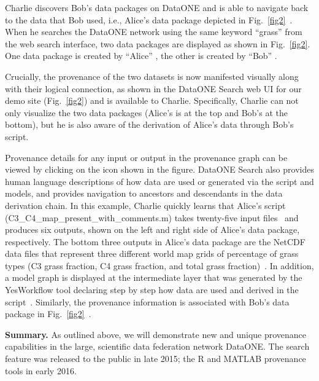 \documentclass[a4paper]{llncs}
\newcommand{\mypara}[1]{\vspace{4pt}\noindent\textbf{#1}}
\begin{document}
Charlie discovers Bob's data packages on DataONE and is able to navigate back to the data that Bob used, i.e., Alice's data package depicted in Fig.~\ref{fig2}~\cite{Katz,data-trajectories}. When he searches the DataONE network using the same keyword ``grass'' from the web search interface, two data packages are displayed as shown in Fig.~\ref{fig2}. One data package is created by ``Alice'' \cite{yaxing}, the other is created by ``Bob'' \cite{christopher}. 

Crucially, the provenance of the two datasets is now manifested visually along with their logical connection, as shown in the DataONE Search web UI for our demo site \cite{dataone-demo} (Fig.~\ref{fig2}) and is available to Charlie. Specifically, Charlie can not only visualize the two data packages (Alice's is at the top and Bob's at the bottom), but he is also aware of the derivation of Alice's data through Bob's script.

Provenance details for any input or output in the provenance graph can be viewed by clicking on the icon shown in the figure. DataONE Search also provides human language descriptions of how data are used or generated via the script and models, and provides navigation to ancestors and descendants in the data derivation chain. 
%
In this example, Charlie quickly learns that Alice's script (C3\_C4\_map\_present\_with\_comments.m) takes twenty-five input files~\cite{MsTMIP-model-driver-data-set} and produces six outputs, shown on the left and right side of Alice's data package, respectively. The bottom three outputs in Alice's data package are the NetCDF data files that represent three different world map grids of percentage of grass types (C3 grass fraction, C4 grass fraction, and total grass fraction)~\cite{MsTMIP-model-driver-data-set}. In addition, a model graph is displayed at the intermediate layer that was generated by the YesWorkflow tool declaring step by step how data are used and derived in the script~\cite{yesworkflow}. Similarly, the provenance information is associated with Bob's data package in Fig.~\ref{fig2}~\cite{dataone-prov-tech-report-2016,MsTMIP-model-output-data-set}.



\mypara{Summary.}  As outlined above, we will demonstrate new and unique provenance capabilities in the large, scientific data federation network DataONE. The search feature was released to the public in late 2015; the R and MATLAB provenance tools in early 2016.

\begin{small}


\end{small}
\end{document}
